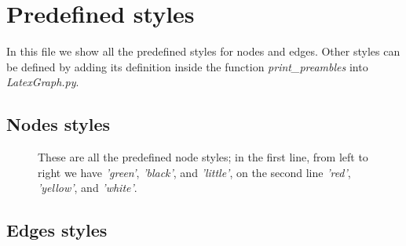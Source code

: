 \documentclass{article}
\begin{document}
\maketitle
    
\section{Predefined styles}
In this file we show all the predefined styles for nodes and edges. Other styles can be defined by adding its definition inside the function \textit{print\_preambles} into \textit{LatexGraph.py}.
    
	\subsection{Nodes styles}
	
	\begin{figure}[H]
		\begin{center}
		\end{center}
		\caption{These are all the predefined node styles; in the first line, from left to right we have \textit{'green'}, \textit{'black'}, and \textit{'little'}, on the second line \textit{'red'}, \textit{'yellow'}, and \textit{'white'}.}
		\label{fig:lat1a}
	\end{figure}
	
	\subsection{Edges styles}
	
\end{document}
